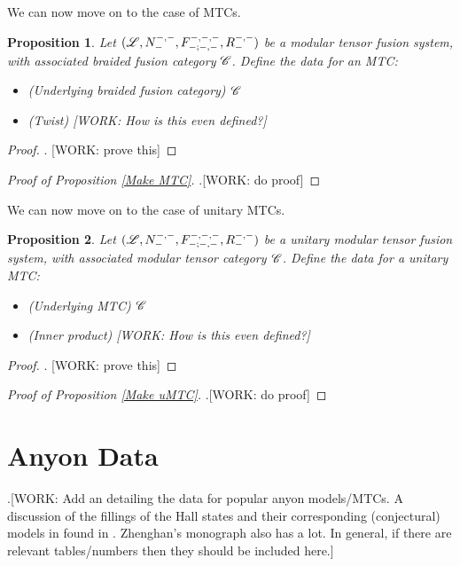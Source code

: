 \documentclass{article}
\newtheorem{proposition}{Proposition}[section]
\theoremstyle{definition}
\numberwithin{figure}{section}
\begin{document}
We can now move on to the case of MTCs.

\begin{proposition} Let $(\mathscr{L},N^{\--,\--}_{\--},F^{\--,\--,\--}_{\--;\--,\--},R^{\--,\--}_{\--})$ be a modular tensor fusion system, with associated braided fusion category $\mathscr{C}$. Define the data for an MTC:

\begin{itemize}
\item (Underlying braided fusion category) $\mathscr{C}$
\item (Twist) [WORK: How is this even defined?]
\end{itemize}
\end{proposition}
\begin{proof}. [WORK: prove this]
\end{proof}

\begin{proof}[Proof of Proposition \ref{Make MTC}] .[WORK: do proof]
\end{proof}

We can now move on to the case of unitary MTCs.

\begin{proposition} Let $(\mathscr{L},N^{\--,\--}_{\--},F^{\--,\--,\--}_{\--;\--,\--},R^{\--,\--}_{\--})$ be a unitary modular tensor fusion system, with associated modular tensor category $\mathscr{C}$. Define the data for a unitary MTC:

\begin{itemize}
\item (Underlying MTC) $\mathscr{C}$
\item (Inner product) [WORK: How is this even defined?]
\end{itemize}
\end{proposition}
\begin{proof}. [WORK: prove this]
\end{proof}


\begin{proof}[Proof of Proposition \ref{Make uMTC}] .[WORK: do proof]
\end{proof}

\section{Anyon Data}

.[WORK: Add an detailing the data for popular anyon models/MTCs. A discussion of the fillings of the Hall states and their corresponding (conjectural) models in found in \cite{bruillard2017fermionic}. Zhenghan's monograph also has a lot. In general, if there are relevant tables/numbers then they should be included here.]



\end{document}
